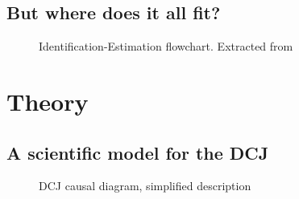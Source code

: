\documentclass[
  authoryear,
  preprint,
  1p]{elsarticle}
\begin{document}
\subsection{But where does it all fit?}\label{sec-background-where}

\begin{figure}


\caption{\label{fig-IEflow}Identification-Estimation flowchart.
Extracted from \citet[32]{Neal_2020}}

\end{figure}%

\section{Theory}\label{sec-theory}

\subsection{A scientific model for the DCJ}\label{sec-theory-scientific}

\begin{figure}


\caption{\label{fig-SciModel_simp1}DCJ causal diagram, simplified
description}

\end{figure}%
\end{document}
